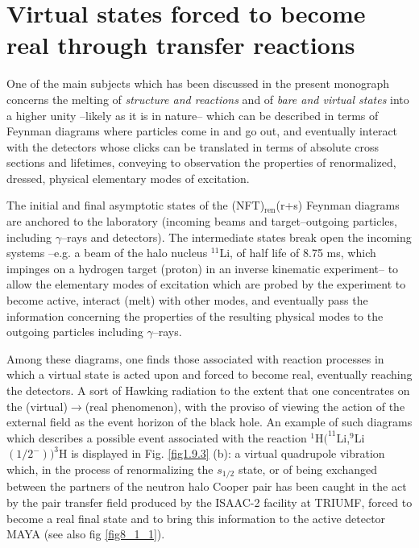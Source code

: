%
%
%
%
%
\section[Virtual states forced to become real]{Virtual states forced to become real through transfer reactions}\label{C6S4}
One of the main subjects which has been discussed in the present monograph concerns the melting of \textit{structure and reactions} and of \textit{bare and virtual states} into a higher unity --likely as it is in nature-- which can be described in terms of Feynman diagrams where particles come in and go out, and eventually interact with the detectors whose clicks can be translated in terms of absolute cross sections and lifetimes, conveying to observation the properties of renormalized, dressed, physical elementary modes of excitation.


The initial and final asymptotic states of the (NFT)$_{\text{ren}}$(r+s) Feynman diagrams are anchored to the laboratory (incoming beams and target--outgoing particles, including $\gamma$--rays and detectors). The intermediate states break open the incoming systems --e.g. a beam of the halo nucleus $^{11}$Li, of half life of 8.75 ms, which impinges on a hydrogen target (proton) in an inverse kinematic experiment-- to allow the elementary modes of excitation which are probed by the experiment to become active, interact (melt) with other modes, and eventually pass the information concerning the properties of the resulting physical modes to the outgoing particles including $\gamma$--rays.


Among these diagrams, one finds those associated with reaction processes in which a virtual state is acted upon and forced to become real, eventually reaching the detectors. A sort of Hawking radiation to the extent that one concentrates on the (virtual)$\to$(real phenomenon), with the proviso of viewing the action of the external field as the event horizon of the black hole.
An example of such diagrams which describes a possible event associated with the reaction $^1$H$(^{11}$Li,$^9$Li$(1/2^-))^3$H is displayed in Fig. \ref{fig1.9.3} (b): a virtual quadrupole vibration which, in the process of renormalizing the $s_{1/2}$ state, or of being exchanged between the partners of the neutron halo Cooper pair has been caught in the act by the pair transfer field produced by the ISAAC-2 facility at TRIUMF, forced to become a real final state and to bring this information to the active detector MAYA (see also fig \ref{fig8_1_1}).
